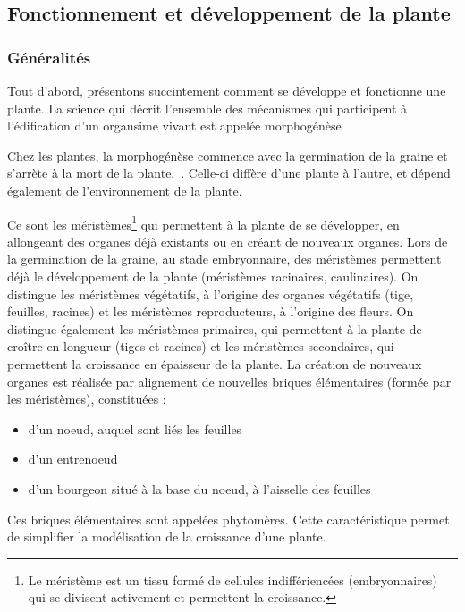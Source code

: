 \subsection{Fonctionnement et développement de la plante}

\subsubsection{Généralités}

Tout d'abord, présentons succintement comment se développe et fonctionne une plante. 
La science qui décrit l'ensemble des mécanismes qui participent à l'édification d'un organsime vivant est appelée morphogénèse

Chez les plantes, la morphogénèse commence avec la germination de la graine et s'arrète à la mort de la plante.~\cite[p.~22]{these_modelisation}.
Celle-ci diffère d'une plante à l'autre, et dépend également de l'environnement de la plante.

Ce sont les méristèmes\footnote{Le méristème est un tissu formé de cellules indiffériencées (embryonnaires) qui se divisent activement et permettent la croissance.} qui permettent à la plante de se développer, en allongeant des organes déjà existants ou en créant de nouveaux organes.
Lors de la germination de la graine, au stade embryonnaire, des méristèmes permettent déjà le développement de la plante (méristèmes racinaires, caulinaires).
On distingue les méristèmes végétatifs, à l’origine des organes végétatifs (tige, feuilles, racines) et les méristèmes reproducteurs, à l’origine des fleurs.
On distingue également les méristèmes primaires, qui permettent à la plante de croître en longueur (tiges et racines) et les méristèmes secondaires, qui permettent la croissance en épaisseur de la plante.
La création de nouveaux organes est réalisée par alignement de nouvelles briques élémentaires (formée par les méristèmes), constituées :
\begin{itemize}
	\item d'un noeud, auquel sont liés les feuilles
	\item d'un entrenoeud 
	\item d'un bourgeon situé à la base du noeud, à l'aisselle des feuilles
\end{itemize} 

Ces briques élémentaires sont appelées phytomères. Cette caractéristique permet de simplifier la modélisation de la croissance d'une plante.



